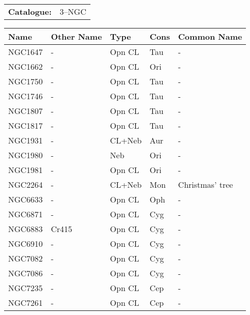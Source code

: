 \begin{tabular}{ p{0.9in} p{1.3in}}
{\bf Catalogue:} & 3--NGC \\ 
\end{tabular}
\centering 
\begin{longtable}{ p{0.7in}  p{1.0in}  p{0.6in}  p{0.9in}  p{4.0in} }
\hline 
{\bf Name} & {\bf Other Name} & {\bf Type} & {\bf Cons} & {\bf Common Name} \\ 
\hline 
NGC1647 & - & Opn CL & Tau & - \\ 
NGC1662 & - & Opn CL & Ori & - \\ 
NGC1750 & - & Opn CL & Tau & - \\ 
NGC1746 & - & Opn CL & Tau & - \\ 
NGC1807 & - & Opn CL & Tau & - \\ 
NGC1817 & - & Opn CL & Tau & - \\ 
NGC1931 & - & CL+Neb & Aur & - \\ 
NGC1980 & - & Neb & Ori & - \\ 
NGC1981 & - & Opn CL & Ori & - \\ 
NGC2264 & - & CL+Neb & Mon & Christmas' tree \\ 
NGC6633 & - & Opn CL & Oph & - \\ 
NGC6871 & - & Opn CL & Cyg & - \\ 
NGC6883 & Cr415 & Opn CL & Cyg & - \\ 
NGC6910 & - & Opn CL & Cyg & - \\ 
NGC7082 & - & Opn CL & Cyg & - \\ 
NGC7086 & - & Opn CL & Cyg & - \\ 
NGC7235 & - & Opn CL & Cep & - \\ 
NGC7261 & - & Opn CL & Cep & - \\ 
\hline 
\end{longtable} 

